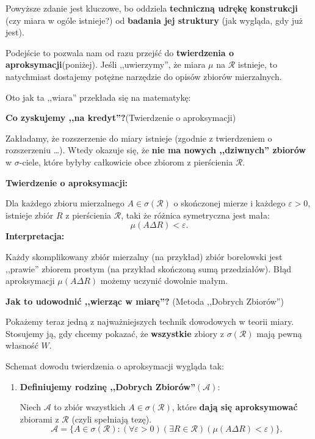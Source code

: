 \begin{remark}[Wiara.]
Powyższe zdanie jest kluczowe, bo oddziela \textbf{techniczną udrękę konstrukcji} (czy miara w ogóle istnieje?) od \textbf{badania jej struktury} (jak wygląda, gdy już jest).

Podejście to pozwala nam od razu przejść do \textbf{twierdzenia o aproksymacji}(poniżej). Jeśli ,,uwierzymy'', że miara $\mu$ na $\mathcal{R}$ istnieje, to natychmiast dostajemy potężne narzędzie do opisów zbiorów mierzalnych.

Oto jak ta ,,wiara'' przekłada się na matematykę:

\noindent \textbf{Co zyskujemy ,,na kredyt''?}(Twierdzenie o aproksymacji)

Zakładamy, że rozszerzenie do miary istnieje (zgodnie z twierdzeniem o rozszerzeniu \ldots). Wtedy okazuje się, że \textbf{nie ma nowych ,,dziwnych'' zbiorów} w $\sigma $-ciele, które byłyby całkowicie obce zbiorom z pierścienia $\mathcal{R}$.

\noindent \textbf{Twierdzenie o aproksymacji:}

Dla każdego zbioru mierzalnego $A\in \sigma\left( \mathcal{R} \right)  $ o skończonej mierze i każdego $\varepsilon > 0 $, istnieje zbiór $R$ z pierścienia $\mathcal{R}$, taki że różnica symetryczna jest mała:
\[
\mu\left( A \Delta R \right) < \varepsilon 
.\] 
\noindent \textbf{Interpretacja:} 

Każdy skomplikowany zbiór mierzalny (na przykład) zbiór borelowski jest ,,prawie'' zbiorem prostym (na przykład skończoną sumą przedziałów). Błąd aproksymacji $\mu\left( A \Delta R \right) $ możemy uczynić dowolnie małym.

\noindent \textbf{Jak to udowodnić ,,wierząc w miarę''?} (Metoda ,,Dobrych Zbiorów'')

Pokażemy teraz jedną z najważniejszych technik dowodowych w teorii miary. Stosujemy ją, gdy chcemy pokazać, że \textbf{wszystkie} zbiory z $\sigma\left( \mathcal{R} \right) $ mają pewną własność $W$.

\noindent Schemat dowodu twierdzenia o aproksymacji wygląda tak:
\begin{enumerate}[label=\arabic*)]
	\item \textbf{Definiujemy rodzinę ,,Dobrych Zbiorów''}$\bm{ \left( \mathcal{A} \right)  } :$ 

		Niech $\mathcal{A}$ to zbiór wszystkich $A\in \sigma \left( \mathcal{R} \right) $, które \textbf{dają się aproksymować} zbiorami z $\mathcal{R}$ (czyli spełniają tezę).
		\[
		\mathcal{A} = \{A\in \sigma\left( \mathcal{R} \right): \left(\forall \varepsilon > 0 \right)\left(\exists R \in \mathcal{R} \right)\left( \mu\left( A \Delta R \right) < \varepsilon  \right)    \}  
		.\] 


\end{enumerate}
\end{remark}
